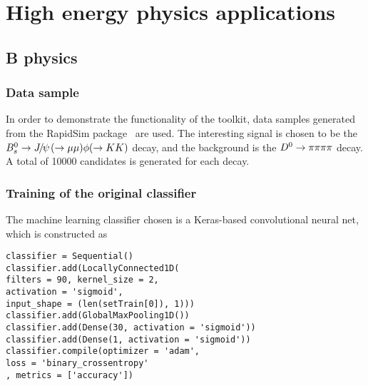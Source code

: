\section{High energy physics applications}
\label{sec:hep}

\subsection{B physics}

\subsubsection{Data sample}

In order to demonstrate the functionality of the toolkit, data samples generated
from the RapidSim package~\cite{rapid} are used. The interesting signal is chosen
to be the ${{B}^0_{s}}\rightarrow{\ensuremath{{J\mskip -3mu/\mskip -2mu\psi\mskip 2mu}}}(\rightarrow\mu\mu )\phi (\rightarrow KK )$ decay, and the background is
the ${{D}^0}\rightarrow\pi\pi\pi\pi$ decay. A total of 10000 candidates is generated for each decay.

\subsubsection{Training of the original classifier}
\label{sec:orig_training}

The machine learning classifier chosen is a Keras-based convolutional neural net,
which is constructed as
\begin{lstlisting}
classifier = Sequential()
classifier.add(LocallyConnected1D(
filters = 90, kernel_size = 2, 
activation = 'sigmoid', 
input_shape = (len(setTrain[0]), 1)))
classifier.add(GlobalMaxPooling1D())
classifier.add(Dense(30, activation = 'sigmoid'))
classifier.add(Dense(1, activation = 'sigmoid'))
classifier.compile(optimizer = 'adam', 
loss = 'binary_crossentropy'
, metrics = ['accuracy'])
\end{lstlisting}

